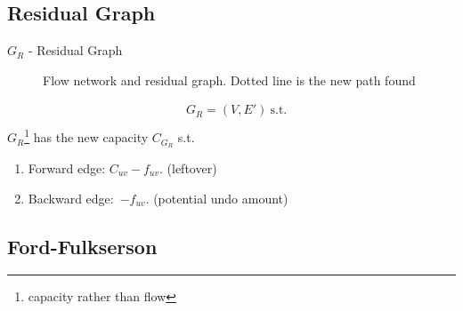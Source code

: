 \documentclass[a4paper]{report}
\theoremstyle{definition}
\begin{document}
\subsection{Residual Graph}
$G_R$ - Residual Graph
\begin{figure}[!htp]
\centering
{}
\caption{Flow network and residual graph. Dotted line is the new path found}
\label{fig:7_4}
\end{figure}
\begin{align*}
&G_R = (V, E')~\text{s.t.}\\
\end{align*}
$G_R$\footnote{capacity rather than flow} has the new capacity $C_{G_R}$ s.t.
\begin{enumerate}
\item Forward edge: $C_{uv}-f_{uv}$. (leftover)
\item Backward edge:\ $-f_{uv}$. (potential undo amount)
\end{enumerate}
\subsection{Ford-Fulkserson}
\end{document}
